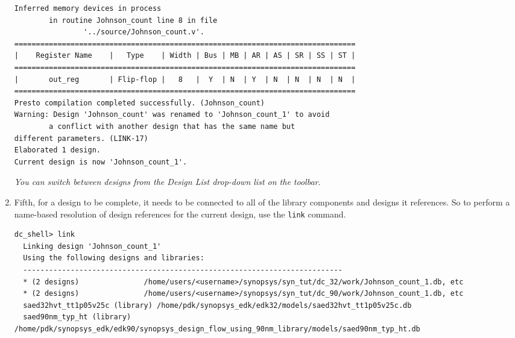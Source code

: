 \documentclass[a4paper,12pt,twoside]{article}
\begin{document}
\begin{enumerate}
\begin{verbatim}
Inferred memory devices in process
        in routine Johnson_count line 8 in file
                '../source/Johnson_count.v'.
===============================================================================
|    Register Name    |   Type    | Width | Bus | MB | AR | AS | SR | SS | ST |
===============================================================================
|       out_reg       | Flip-flop |   8   |  Y  | N  | Y  | N  | N  | N  | N  |
===============================================================================
Presto compilation completed successfully. (Johnson_count)
Warning: Design 'Johnson_count' was renamed to 'Johnson_count_1' to avoid
        a conflict with another design that has the same name but
different parameters. (LINK-17)
Elaborated 1 design.
Current design is now 'Johnson_count_1'.
    \end{verbatim}
    \textit{You can switch between designs from the Design List drop-down list on the toolbar}.
    \item Fifth, for a design to be complete, it needs to be connected to all of the library components and designs it references. So to perform a name-based resolution of design references for the current design, use the \texttt{link} command.
    \begin{verbatim}
dc_shell> link
  Linking design 'Johnson_count_1'
  Using the following designs and libraries:
  --------------------------------------------------------------------------
  * (2 designs)               /home/users/<username>/synopsys/syn_tut/dc_32/work/Johnson_count_1.db, etc
  * (2 designs)               /home/users/<username>/synopsys/syn_tut/dc_90/work/Johnson_count_1.db, etc
  saed32hvt_tt1p05v25c (library) /home/pdk/synopsys_edk/edk32/models/saed32hvt_tt1p05v25c.db
  saed90nm_typ_ht (library)   /home/pdk/synopsys_edk/edk90/synopsys_design_flow_using_90nm_library/models/saed90nm_typ_ht.db


\end{verbatim}
\end{enumerate}
\end{document}
